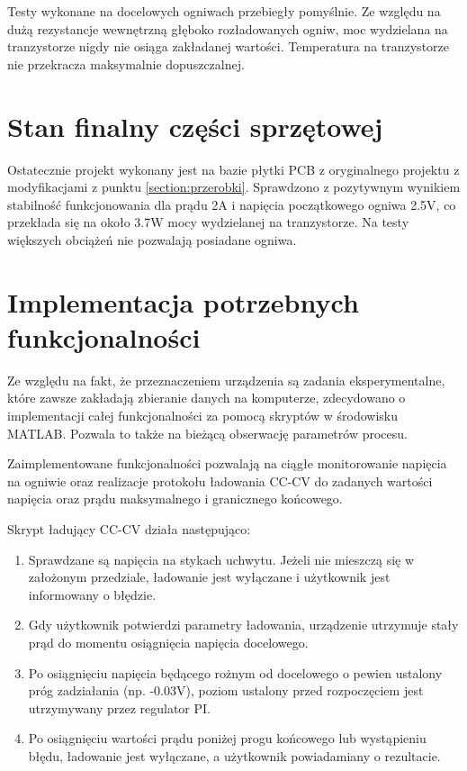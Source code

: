 \documentclass[polish,engineer]{polsl-msth}
\begin{document}
Testy wykonane na docelowych ogniwach przebiegły pomyślnie. Ze względu na dużą rezystancje wewnętrzną głęboko rozładowanych ogniw, moc wydzielana na tranzystorze nigdy nie osiąga zakładanej wartości. Temperatura na tranzystorze nie przekracza maksymalnie dopuszczalnej.

\section{Stan finalny części sprzętowej}
Ostatecznie projekt wykonany jest na bazie płytki PCB z oryginalnego projektu z modyfikacjami z punktu \ref{section:przerobki}. Sprawdzono z pozytywnym wynikiem stabilność funkcjonowania dla prądu 2A i napięcia początkowego ogniwa 2.5V, co przekłada się na około 3.7W mocy wydzielanej na tranzystorze. Na testy większych obciążeń nie pozwalają posiadane ogniwa.

\section{Implementacja potrzebnych funkcjonalności}
Ze względu na fakt, że przeznaczeniem urządzenia są zadania eksperymentalne, które zawsze zakładają zbieranie danych na komputerze, zdecydowano o implementacji całej funkcjonalności za pomocą skryptów w środowisku MATLAB. Pozwala to także na bieżącą obserwację parametrów procesu.

Zaimplementowane funkcjonalności pozwalają na ciągłe monitorowanie napięcia na ogniwie oraz realizacje protokołu ładowania CC-CV do zadanych wartości napięcia oraz prądu maksymalnego i granicznego końcowego.

Skrypt ładujący CC-CV działa następująco:
\begin{enumerate}
    \item Sprawdzane są napięcia na stykach uchwytu. Jeżeli nie mieszczą się w założonym przedziale, ładowanie jest wyłączane i użytkownik jest informowany o błędzie.
    \item Gdy użytkownik potwierdzi parametry ładowania, urządzenie utrzymuje stały prąd do momentu osiągnięcia napięcia docelowego.
    \item Po osiągnięciu napięcia będącego rożnym od docelowego o pewien ustalony próg zadziałania (np. -0.03V), poziom ustalony przed rozpoczęciem jest utrzymywany przez regulator PI. 
    \item Po osiągnięciu wartości prądu poniżej progu końcowego lub wystąpieniu błędu, ładowanie jest wyłączane, a użytkownik powiadamiany o rezultacie.
\end{enumerate}
\end{document}
